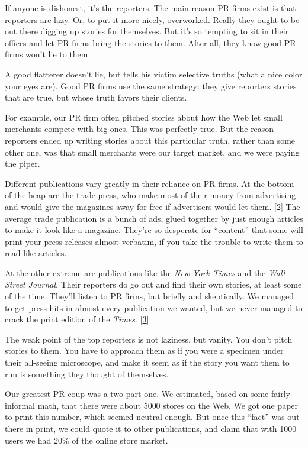 If anyone is dishonest, it's the reporters. The main reason PR firms
exist is that reporters are lazy. Or, to put it more nicely, overworked.
Really they ought to be out there digging up stories for themselves. But
it's so tempting to sit in their offices and let PR firms bring the
stories to them. After all, they know good PR firms won't lie to them.

A good flatterer doesn't lie, but tells his victim selective truths
(what a nice color your eyes are). Good PR firms use the same strategy:
they give reporters stories that are true, but whose truth favors their
clients.

For example, our PR firm often pitched stories about how the Web let
small merchants compete with big ones. This was perfectly true. But the
reason reporters ended up writing stories about this particular truth,
rather than some other one, was that small merchants were our target
market, and we were paying the piper.

Different publications vary greatly in their reliance on PR firms. At
the bottom of the heap are the trade press, who make most of their money
from advertising and would give the magazines away for free if
advertisers would let them. {[}\hyperref[f2n]{2}{]} The average trade
publication is a bunch of ads, glued together by just enough articles to
make it look like a magazine. They're so desperate for ``content'' that
some will print your press releases almost verbatim, if you take the
trouble to write them to read like articles.

At the other extreme are publications like the \emph{New York Times} and
the \emph{Wall Street Journal}. Their reporters do go out and find their
own stories, at least some of the time. They'll listen to PR firms, but
briefly and skeptically. We managed to get press hits in almost every
publication we wanted, but we never managed to crack the print edition
of the \emph{Times}. {[}\hyperref[f3n]{3}{]}

The weak point of the top reporters is not laziness, but vanity. You
don't pitch stories to them. You have to approach them as if you were a
specimen under their all-seeing microscope, and make it seem as if the
story you want them to run is something they thought of themselves.

Our greatest PR coup was a two-part one. We estimated, based on some
fairly informal math, that there were about 5000 stores on the Web. We
got one paper to print this number, which seemed neutral enough. But
once this ``fact'' was out there in print, we could quote it to other
publications, and claim that with 1000 users we had 20\% of the online
store market.

